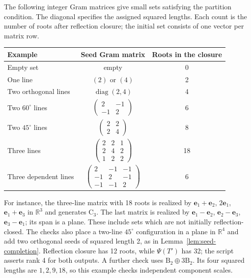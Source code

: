 \documentclass[11pt]{amsart}
\newcommand\re{{\mathbb R}}%
\newcommand\opk[1]{\mathop{\mathrm{#1}}\nolimits}
\theoremstyle{definition}
\newcommand{\typ}[1]{\mathrm{#1}}
\newcommand{\Ze}{{\mathbf e}}
\begin{document}
The following integer Gram matrices give small sets satisfying the
partition condition. The diagonal specifies the assigned squared
lengths. Each count is the number of roots after reflection closure;
the initial set consists of one vector per matrix row.
\begin{center}
\begin{tabular}{@{}lcc@{}}
\toprule
Example&Seed Gram matrix&Roots in the closure\\\midrule
Empty set&empty&0\\[2pt]
One line&$(2)$ or $(4)$&2\\[2pt]
Two orthogonal lines&$\opk{diag}(2,4)$&4\\[2pt]
Two $60^\circ$ lines&$\left(\begin{smallmatrix}2&-1\\-1&2\end{smallmatrix}\right)$&6\\[3pt]
Two $45^\circ$ lines&$\left(\begin{smallmatrix}2&2\\2&4\end{smallmatrix}\right)$&8\\[3pt]
Three lines&$\left(\begin{smallmatrix}2&2&1\\2&4&2\\1&2&2\end{smallmatrix}\right)$&18\\[3pt]
Three dependent lines&$\left(\begin{smallmatrix}2&-1&-1\\-1&2&-1\\-1&-1&2\end{smallmatrix}\right)$&6\\
\bottomrule
\end{tabular}
\end{center}
For instance, the three-line matrix with 18 roots is realized by
$\Ze_1+\Ze_2$, $2\Ze_1$, $\Ze_1+\Ze_3$ in $\re^3$ and
generates $\typ C_3$. The last matrix is realized by
$\Ze_1-\Ze_2$, $\Ze_2-\Ze_3$, $\Ze_3-\Ze_1$; its span is a
plane. These include sets which are not initially reflection-closed.
The checks also place a two-line $45^\circ$ configuration in a plane
in $\re^4$ and add two orthogonal seeds of squared length 2, as in
Lemma~\ref{lem:seed-completion}. Reflection closure has 12 roots,
while $\Psi(T')$ has 32; the script asserts rank 4 for both outputs.
A further check uses
$\typ B_2\oplus3\typ B_2$. Its four squared lengths are
$1,2,9,18$, so this example checks independent component scales.
\end{document}
